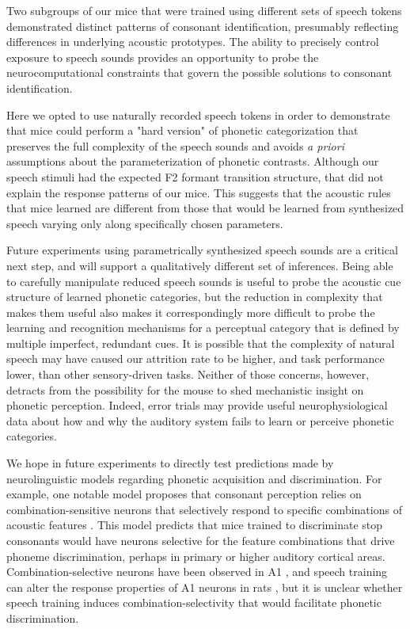 \documentclass[11pt]{article}\usepackage[]{graphicx}\usepackage[]{color}
\begin{document}
Two subgroups of our mice that were trained using different sets of speech tokens demonstrated distinct patterns of consonant identification, presumably reflecting differences in underlying acoustic prototypes. The ability to precisely control exposure to speech sounds provides an opportunity to probe the neurocomputational constraints that govern the possible solutions to consonant identification.

Here we opted to use naturally recorded speech tokens in order to demonstrate that mice could perform a "hard version" of phonetic categorization that preserves the full complexity of the speech sounds and avoids \textit{a priori} assumptions about the parameterization of phonetic contrasts. Although our speech stimuli had the expected F2 formant transition structure, that did not explain the response patterns of our mice. This suggests that the acoustic rules that mice learned are different from those that would be learned from synthesized speech varying only along specifically chosen parameters.

Future experiments using parametrically synthesized speech sounds are a critical next step, and will support a qualitatively different set of inferences. Being able to carefully manipulate reduced speech sounds is useful to probe the acoustic cue structure of learned phonetic categories, but the reduction in complexity that makes them useful also makes it correspondingly more difficult to probe the learning and recognition mechanisms for a perceptual category that is defined by multiple imperfect, redundant cues. It is possible that the complexity of natural speech may have caused our attrition rate to be higher, and task performance lower, than other sensory-driven tasks. Neither of those concerns, however, detracts from the possibility for the mouse to shed mechanistic insight on phonetic perception. Indeed, error trials may provide useful neurophysiological data about how and why the auditory system fails to learn or perceive phonetic categories.

We hope in future experiments to directly test predictions made by neurolinguistic models regarding phonetic acquisition and discrimination. For example, one notable model proposes that consonant perception relies on combination-sensitive neurons that selectively respond to specific combinations of acoustic features \cite{Sussman1998}. This model predicts that mice trained to discriminate stop consonants would have neurons selective for the feature combinations that drive phoneme discrimination, perhaps in primary or higher auditory cortical areas. Combination-selective neurons have been observed in A1 \cite{Sadagopan2009,Wang2005a}, and speech training can alter the response properties of A1 neurons in rats \cite{Engineer2015}, but it is unclear whether speech training induces combination-selectivity that would facilitate phonetic discrimination.
\end{document}
